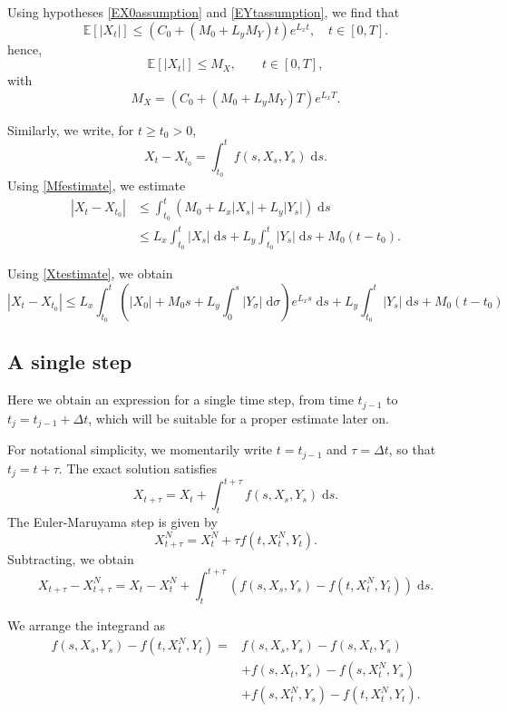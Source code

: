 \documentclass[reqno,12pt]{amsart}
\theoremstyle{plain}%
\theoremstyle{definition}
\begin{document}
Using hypotheses \eqref{EX0assumption} and \eqref{EYtassumption}, we find that
$$
\mathbb{E}[|X_t|] \leq \left( C_0 + (M_0 + L_y M_Y) t \right) e^{L_x t}, \quad t \in [0, T].
$$
hence,
\begin{equation}
    \label{EXtestimate}
    \mathbb{E}[|X_t|] \leq M_X, \qquad t \in [0, T],
\end{equation}
with
\begin{equation}
    \label{MXt}
    M_X = (C_0 + (M_0 + L_y M_Y)T)e^{L_x T}.
\end{equation}


Similarly, we write, for $t \geq t_0 > 0$,
$$
X_t - X_{t_0} = \int_{t_0}^t f(s, X_s, Y_s) \;\mathrm{d}s.
$$
Using \eqref{Mfestimate}, we estimate
\begin{align*}
    |X_t - X_{t_0}| & \leq \int_{t_0}^t \left(M_0 + L_x |X_s| + L_y|Y_s| \right)\;\mathrm{d}s \\
    & \leq L_x \int_{t_0}^t |X_s| \;\mathrm{d}s + L_y\int_{t_0}^t |Y_s|\;\mathrm{d}s + M_0(t - t_0).
\end{align*}

Using \eqref{Xtestimate}, we obtain
\begin{equation}
    |X_t - X_{t_0}| \leq L_x \int_{t_0}^t \left( |X_0| + M_0 s  + L_y \int_0^s |Y_\sigma| \;\mathrm{d}\sigma\right) e^{L_x s} \;\mathrm{d}s + L_y\int_{t_0}^t |Y_s|\;\mathrm{d}s + M_0(t - t_0)
\end{equation}

\subsection{A single step}

Here we obtain an expression for a single time step, from time $t_{j-1}$ to $t_j = t_{j-1} + \Delta t$, which will be suitable for a proper estimate later on.

For notational simplicity, we momentarily write $t = t_{j-1}$ and $\tau = \Delta t$, so that $t_j = t + \tau$. The exact solution satisfies
$$
X_{t + \tau} = X_t + \int_t^{t + \tau} f(s, X_s, Y_s) \;\mathrm{d}s.
$$
The Euler-Maruyama step is given by
$$
X_{t+\tau}^N = X_t^N + \tau f(t, X_t^N, Y_t).
$$
Subtracting, we obtain
$$
X_{t + \tau} - X_{t + \tau}^N = X_t - X_t^N + \int_t^{t + \tau} \left( f(s, X_s, Y_s) - f(t, X_t^N, Y_t) \right)\;\mathrm{d}s.
$$

We arrange the integrand as
\begin{align*}
f(s, X_s, Y_s) - f(t, X_t^N, Y_t) = & f(s, X_s, Y_s) - f(s, X_t, Y_s) \\ 
 & + f(s, X_t, Y_s) - f(s, X_t^N, Y_s) \\
 & + f(s, X_t^N, Y_s) - f(t, X_t^N, Y_t).
\end{align*}
\end{document}
